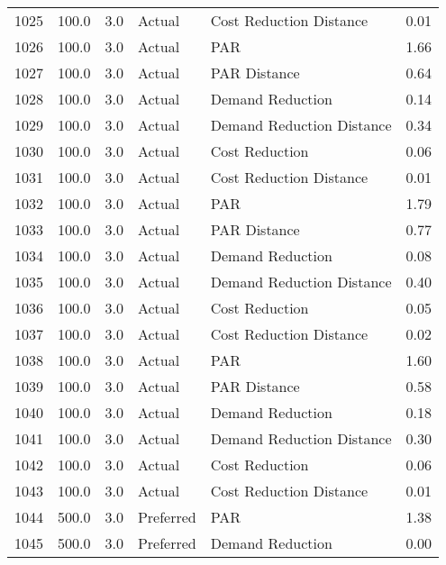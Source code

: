 \begin{longtable}{lrrllr}
1025 &        100.0 &     3.0 &         Actual &    Cost Reduction Distance &   0.01 \\
1026 &        100.0 &     3.0 &         Actual &                        PAR &   1.66 \\
1027 &        100.0 &     3.0 &         Actual &               PAR Distance &   0.64 \\
1028 &        100.0 &     3.0 &         Actual &           Demand Reduction &   0.14 \\
1029 &        100.0 &     3.0 &         Actual &  Demand Reduction Distance &   0.34 \\
1030 &        100.0 &     3.0 &         Actual &             Cost Reduction &   0.06 \\
1031 &        100.0 &     3.0 &         Actual &    Cost Reduction Distance &   0.01 \\
1032 &        100.0 &     3.0 &         Actual &                        PAR &   1.79 \\
1033 &        100.0 &     3.0 &         Actual &               PAR Distance &   0.77 \\
1034 &        100.0 &     3.0 &         Actual &           Demand Reduction &   0.08 \\
1035 &        100.0 &     3.0 &         Actual &  Demand Reduction Distance &   0.40 \\
1036 &        100.0 &     3.0 &         Actual &             Cost Reduction &   0.05 \\
1037 &        100.0 &     3.0 &         Actual &    Cost Reduction Distance &   0.02 \\
1038 &        100.0 &     3.0 &         Actual &                        PAR &   1.60 \\
1039 &        100.0 &     3.0 &         Actual &               PAR Distance &   0.58 \\
1040 &        100.0 &     3.0 &         Actual &           Demand Reduction &   0.18 \\
1041 &        100.0 &     3.0 &         Actual &  Demand Reduction Distance &   0.30 \\
1042 &        100.0 &     3.0 &         Actual &             Cost Reduction &   0.06 \\
1043 &        100.0 &     3.0 &         Actual &    Cost Reduction Distance &   0.01 \\
1044 &        500.0 &     3.0 &      Preferred &                        PAR &   1.38 \\
1045 &        500.0 &     3.0 &      Preferred &           Demand Reduction &   0.00 \\

\end{longtable}
